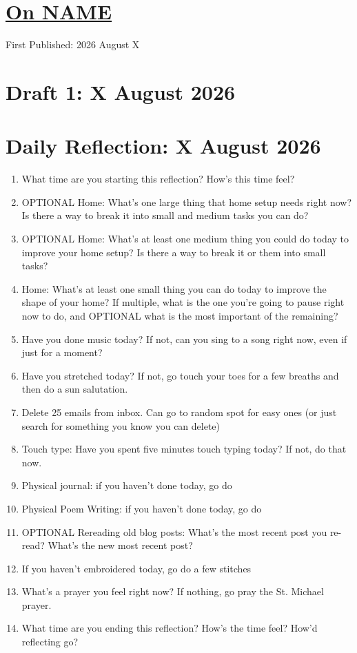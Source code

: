 \documentclass[12pt]{article}
\renewcommand{\,}{\textsuperscript{,}}
\renewcommand{\title}[2]{\section{\href{#1.html}{#2}}}
\newcommand{\published}[1]{First Published: #1}
\newcommand{\draft}[1]{\section{Draft #1}}
\newcommand{\dailyreflect}[1]{\section{Daily Reflection: #1}}
\begin{document}
\title{NAME}{On NAME}
\published{2026 August X}
\draft{1: X August 2026}

\dailyreflect{X August 2026}


\begin{enumerate}

\item What time are you starting this reflection? How's this time feel?

\item OPTIONAL Home: What's one large thing that home setup needs right now? Is there a way to break it into small and medium tasks you can do?

\item OPTIONAL Home: What's at least one medium thing you could do today to improve
your home setup? Is there a way to break it or them into small tasks?

\item Home: What's at least one small thing you can do today to improve the
shape of your home? If multiple, what is the one you're going to pause
right now to do, and OPTIONAL what is the most important of the remaining?

\item Have you done music today? If not, can you sing to a song right now, even if just for a  moment?

\item Have you stretched today? If not, go touch your toes for a few breaths and then do a sun salutation.

\item Delete 25 emails from inbox. Can go to random spot for easy ones (or just search for something you know you can delete)

\item Touch type: Have you spent five minutes touch typing today? If not, do that now.

\item Physical journal: if you haven't done today, go do

\item Physical Poem Writing: if you haven't done today, go do

\item OPTIONAL Rereading old blog posts: What's the most recent post you re-read? What's the new most recent post?

\item If you haven't embroidered today, go do a few stitches

\item What's a prayer you feel right now? If nothing, go pray the St. Michael prayer.

\item What time are you ending this reflection? How's the time feel? How'd reflecting go?

\end{enumerate}
\end{document}
